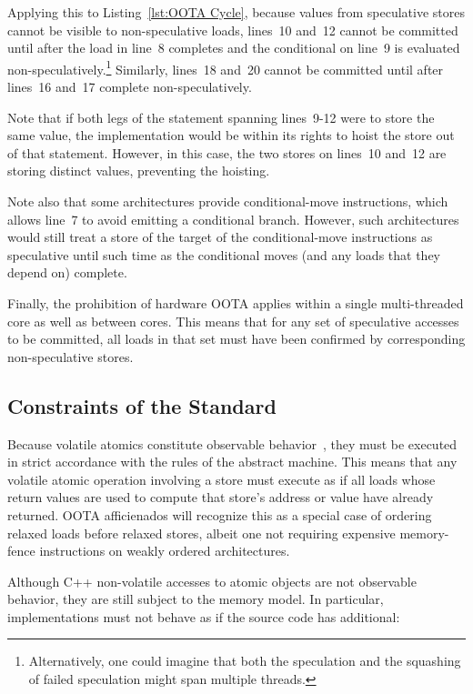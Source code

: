 \documentclass[10]{article}
\begin{document}
Applying this to Listing~\ref{lst:OOTA Cycle}, because values from
speculative stores cannot be visible to non-speculative loads, lines~10
and~12 cannot be committed until after the load in line~8 completes
and the conditional on line~9 is evaluated non-speculatively.\footnote{
	Alternatively, one could imagine that both the speculation
	and the squashing of failed speculation might span multiple
	threads.}
Similarly, lines~18 and~20 cannot be committed until after lines~16
and~17 complete non-speculatively.

Note that if both legs of the  statement spanning lines~9-12 were
to store the same value, the implementation would be within its rights
to hoist the store out of that  statement.
However, in this case, the two stores on lines~10 and~12 are storing
distinct values, preventing the hoisting.

Note also that some architectures provide conditional-move instructions,
which allows line~7 to avoid emitting a conditional branch.
However, such architectures would still treat a store of the
target of the conditional-move instructions as speculative until
such time as the conditional moves (and any loads that they depend
on) complete.

Finally, the prohibition of hardware OOTA applies within a single
multi-threaded core as well as between cores.
This means that for any set of speculative accesses to be committed,
all loads in that set must have been confirmed by corresponding
non-speculative stores.

\subsection{Constraints of the Standard}
\label{sec:Constraints of the Standard}

Because volatile atomics constitute observable
behavior~\cite[]{ThomasKoeppe2023N4950},
they must be executed in strict accordance with the rules of the abstract
machine.
This means that any volatile atomic operation involving a store
must execute as if all loads whose return values are used to compute
that store's address or value have already returned.
OOTA afficienados will recognize this as a special case of ordering
relaxed loads before relaxed stores, albeit one not requiring
expensive memory-fence instructions on weakly ordered architectures.

Although C++ non-volatile accesses to atomic objects are not observable
behavior, they are still subject to the memory model.
In particular, implementations must not behave as if the source code has
additional:
\end{document}
